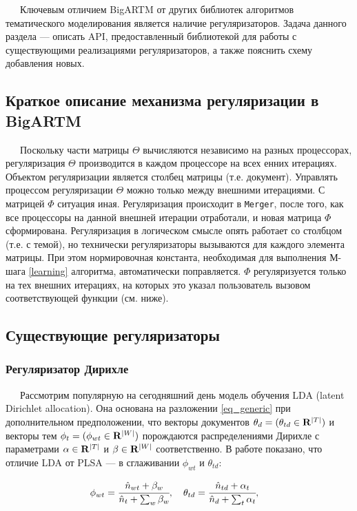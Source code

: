 
$\quad\;\:$Ключевым отличием BigARTM от других библиотек алгоритмов тематического моделирования является наличие регуляризаторов. Задача данного раздела --- описать API, предоставленный библиотекой для работы с существующими реализациями регуляризаторов, а также пояснить схему добавления новых.

\subsection{Краткое описание механизма регуляризации в BigARTM}
$\quad\;\:$Поскольку части матрицы $\Theta$ вычисляются независимо на разных процессорах, регуляризация $\Theta$ производится в каждом процессоре на всех енних итерациях. Объектом регуляризации является столбец матрицы (т.е. документ). Управлять процессом регуляризации $\Theta$ можно только между внешними итерациями. С матрицей $\Phi$ ситуация иная. Регуляризация происходит в \verb|Merger|, после того, как все процессоры на данной внешней итерации отработали, и новая матрица $\Phi$ сформирована. Регуляризация в логическом смысле опять работает со столбцом (т.е. с темой), но технически регуляризаторы вызываются для каждого элемента матрицы. При этом нормировочная константа, необходимая для выполнения М-шага \ref{learning} алгоритма, автоматически поправляется. $\Phi$ регуляризуется только на тех внешних итерациях, на которых это указал пользователь вызовом соответствующей функции (см. ниже). 

\subsection{Существующие регуляризаторы}

\subsubsection{Регуляризатор Дирихле}

$\quad\;\:$Рассмотрим популярную на сегодняшний день модель обучения LDA (latent Dirichlet allocation). Она основана на разложении \ref{eq_generic} при дополнительном предположении, что векторы документов $\theta_d = (\theta_{td} \in {\bf R}^{|T|})$ и векторы тем $\phi_t = (\phi_{wt} \in {\bf R}^{|W|})$ порождаются распределениями Дирихле с параметрами $\alpha \in {\bf R}^{|T|}$ и $\beta \in {\bf R}^{|W|}$ соответственно. В работе \cite{voron_potap_14} показано, что отличие LDA от PLSA --- в сглаживании $\phi_{wt}$ и $\theta_{td}$:

\begin{equation}
	\phi_{wt} = \cfrac{\hat n_{wt} + \beta_w}{\hat n_t + \sum_w \beta_w}, \quad 
 	\theta_{td} = \cfrac{\hat n_{td} + \alpha_t}{\hat n_d + \sum_t \alpha_t}, \quad
\end{equation}


